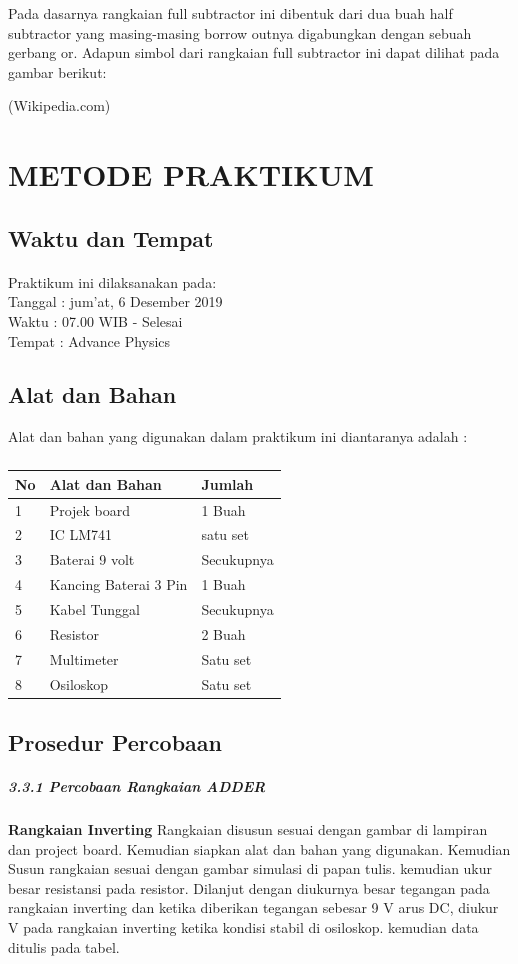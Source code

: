 \documentclass[12pt,a4paper]{article}
\begin{document}
Pada dasarnya rangkaian full subtractor ini dibentuk dari dua buah half subtractor yang masing-masing borrow outnya digabungkan dengan sebuah gerbang or. Adapun simbol dari rangkaian full subtractor ini dapat dilihat pada gambar berikut:
	
\begin{flushright}
(Wikipedia.com) 
\end{flushright}

\newpage
\section{METODE PRAKTIKUM}
\subsection{Waktu dan Tempat}
\paragraph{ }
Praktikum ini dilaksanakan pada:
\\ 		Tanggal : jum'at, 6 Desember 2019
\\ 		Waktu : 07.00 WIB - Selesai
\\ 		Tempat : Advance Physics 


\subsection{Alat dan Bahan}
Alat dan bahan yang digunakan dalam praktikum ini diantaranya adalah : 
\subparagraph*{ }
\begin{tabular}{|l|l|l|}  \hline
No & Alat dan Bahan  & Jumlah  \\ \hline
1  & Projek board & 1 Buah \\ \hline
2  & IC LM741 & satu set \\ \hline
3  & Baterai 9 volt & Secukupnya \\ \hline
4  & Kancing Baterai 3 Pin & 1 Buah \\ \hline
5  & Kabel Tunggal  & Secukupnya \\ \hline
6  & Resistor  & 2 Buah \\ \hline
7  & Multimeter & Satu set \\ \hline
8  & Osiloskop & Satu set \\ \hline
\end{tabular}

  
    
\subsection{Prosedur Percobaan}
\subparagraph{3.3.1 Percobaan Rangkaian ADDER }
\subparagraph{ }
\textbf{Rangkaian Inverting} Rangkaian disusun sesuai dengan gambar di lampiran dan project board. Kemudian siapkan alat dan bahan yang digunakan. Kemudian Susun rangkaian sesuai dengan gambar simulasi di papan tulis. kemudian ukur besar resistansi pada resistor. Dilanjut dengan diukurnya besar tegangan pada rangkaian inverting dan ketika diberikan tegangan sebesar 9 V arus DC, diukur  V pada rangkaian inverting ketika kondisi stabil di osiloskop. kemudian data ditulis pada tabel.
	
\end{document}
